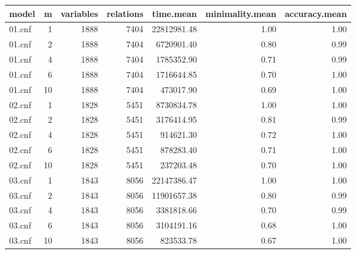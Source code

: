 \begin{table}[ht]
\centering
\begin{tabular}{lrrrrrr}
  \hline
model & m & variables & relations & time.mean & minimality.mean & accuracy.mean \\ 
  \hline
01.cnf &   1 & 1888 & 7404 & 22812981.48 & 1.00 & 1.00 \\ 
  01.cnf &   2 & 1888 & 7404 & 6720901.40 & 0.80 & 0.99 \\ 
  01.cnf &   4 & 1888 & 7404 & 1785352.90 & 0.71 & 0.99 \\ 
  01.cnf &   6 & 1888 & 7404 & 1716644.85 & 0.70 & 1.00 \\ 
  01.cnf &  10 & 1888 & 7404 & 473017.90 & 0.69 & 1.00 \\ 
  02.cnf &   1 & 1828 & 5451 & 8730834.78 & 1.00 & 1.00 \\ 
  02.cnf &   2 & 1828 & 5451 & 3176414.95 & 0.81 & 0.99 \\ 
  02.cnf &   4 & 1828 & 5451 & 914621.30 & 0.72 & 1.00 \\ 
  02.cnf &   6 & 1828 & 5451 & 878283.40 & 0.71 & 1.00 \\ 
  02.cnf &  10 & 1828 & 5451 & 237203.48 & 0.70 & 1.00 \\ 
  03.cnf &   1 & 1843 & 8056 & 22147386.47 & 1.00 & 1.00 \\ 
  03.cnf &   2 & 1843 & 8056 & 11901657.38 & 0.80 & 0.99 \\ 
  03.cnf &   4 & 1843 & 8056 & 3381818.66 & 0.70 & 0.99 \\ 
  03.cnf &   6 & 1843 & 8056 & 3104191.16 & 0.68 & 1.00 \\ 
  03.cnf &  10 & 1843 & 8056 & 823533.78 & 0.67 & 1.00 \\ 
   \hline
\end{tabular}
\end{table}
